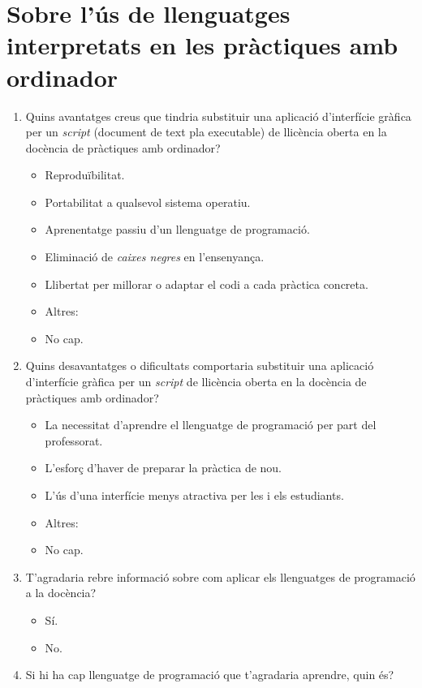 \documentclass[a4paper,12pt]{article}
\newcounter{preg}[section]
\begin{document}
\section{Sobre l'ús de llenguatges interpretats en les pràctiques amb ordinador}
\begin{enumerate}
\item {} Quins avantatges creus que tindria substituir una aplicació d'interfície gràfica per un
      \emph{script} (document de text pla executable) de llicència oberta en la docència de
      pràctiques amb ordinador?
   \begin{itemize}
   \item Reproduïbilitat.
   \item Portabilitat a qualsevol sistema operatiu.
   \item Aprenentatge passiu d'un llenguatge de programació.
   \item Eliminació de \emph{caixes negres} en l'ensenyança.
   \item Llibertat per millorar o adaptar el codi a cada pràctica concreta.
   \item Altres:
   \item No cap.
   \end{itemize}

\item {} Quins desavantatges o dificultats comportaria substituir una aplicació d'interfície gràfica
      per un \emph{script} de llicència oberta en la docència de pràctiques amb ordinador?
   \begin{itemize}
   \item La necessitat d'aprendre el llenguatge de programació per part del professorat.
   \item L'esforç d'haver de preparar la pràctica de nou.
   \item L'ús d'una interfície menys atractiva per les i els estudiants.
   \item Altres:
   \item No cap.
   \end{itemize}

\item {} T'agradaria rebre informació sobre com aplicar els llenguatges de programació a la docència?
   \begin{itemize}
   \item Sí.
   \item No.
   \end{itemize}

\item Si hi ha cap llenguatge de programació que t'agradaria aprendre, quin és?
\vspace*{1cm}
\end{enumerate}
\end{document}
